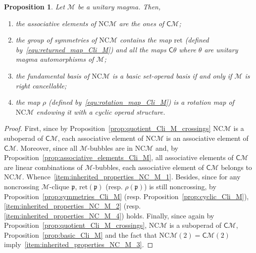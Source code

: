 \documentclass[10pt,reqno]{amsart}
\numberwithin{equation}{subsection}
\newtheorem{Proposition}[Theorem]{Proposition}
\newcommand{\Mca}{\mathcal{M}}
\newcommand{\Pfr}{\mathfrak{p}}
\newcommand{\Cli}{\mathsf{C}}
\newcommand{\NC}{\mathrm{NC}}
\newcommand{\Returned}{\mathrm{ret}}
\begin{document}
\begin{Proposition} \label{prop:inherited_properties_NC_M}
    Let $\Mca$ be a unitary magma. Then,
    \begin{enumerate}[fullwidth,label={(\it\roman*)}]
        \item \label{item:inherited_properties_NC_M_1}
        the associative elements of $\NC\Mca$ are the ones of $\Cli\Mca$;
        \item \label{item:inherited_properties_NC_M_2}
        the group of symmetries of $\NC\Mca$ contains the map
        $\Returned$ (defined by~\eqref{equ:returned_map_Cli_M}) and all
        the maps $\Cli\theta$ where $\theta$ are unitary magma
        automorphisms of $\Mca$;
        \item \label{item:inherited_properties_NC_M_3}
        the fundamental basis of $\NC\Mca$ is a basic set-operad basis
        if and only if $\Mca$ is right cancellable;
        \item \label{item:inherited_properties_NC_M_4}
        the map $\rho$ (defined by~\eqref{equ:rotation_map_Cli_M}) is a
        rotation map of $\NC\Mca$ endowing it with a cyclic operad
        structure.
    \end{enumerate}
\end{Proposition}
\begin{proof}
    First, since by Proposition~\ref{prop:quotient_Cli_M_crossings}
    $\NC\Mca$ is a suboperad of $\Cli\Mca$, each associative element
    of $\NC\Mca$ is an associative element of $\Cli\Mca$. Moreover,
    since all $\Mca$-bubbles are in $\NC\Mca$ and, by
    Proposition~\ref{prop:associative_elements_Cli_M}, all associative
    elements of $\Cli\Mca$ are linear combinations of $\Mca$-bubbles,
    each associative element of $\Cli\Mca$ belongs to $\NC\Mca$.
    Whence~\ref{item:inherited_properties_NC_M_1}. Besides, since for
    any noncrossing $\Mca$-clique $\Pfr$, $\Returned(\Pfr)$ (resp.
    $\rho(\Pfr)$) is still noncrossing, by
    Proposition~\ref{prop:symmetries_Cli_M} (resp.
    Proposition~\ref{prop:cyclic_Cli_M}),
    \ref{item:inherited_properties_NC_M_2} (resp.
    \ref{item:inherited_properties_NC_M_4}) holds. Finally, since again
    by Proposition~\ref{prop:quotient_Cli_M_crossings}, $\NC\Mca$ is a
    suboperad of $\Cli\Mca$, Proposition~\ref{prop:basic_Cli_M} and
    the fact that $\NC\Mca(2) = \Cli\Mca(2)$
    imply~\ref{item:inherited_properties_NC_M_3}.
\end{proof}
\medskip

\end{document}
